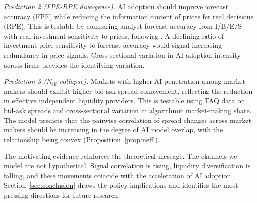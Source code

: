 \emph{Prediction 2 (FPE-RPE divergence).} AI adoption should improve forecast accuracy (FPE) while reducing the information content of prices for real decisions (RPE). This is testable by comparing analyst forecast accuracy from I/B/E/S with real investment sensitivity to prices, following \citet{bond2012}. A declining ratio of investment-price sensitivity to forecast accuracy would signal increasing redundancy in price signals. Cross-sectional variation in AI adoption intensity across firms provides the identifying variation.

\emph{Prediction 3 ($N_{\text{eff}}$ collapse).} Markets with higher AI penetration among market makers should exhibit higher bid-ask spread comovement, reflecting the reduction in effective independent liquidity providers. This is testable using TAQ data on bid-ask spreads and cross-sectional variation in algorithmic market-making share. The model predicts that the pairwise correlation of spread changes across market makers should be increasing in the degree of AI model overlap, with the relationship being convex (Proposition~\ref{prop:neff}).

The motivating evidence reinforces the theoretical message. The channels we model are not hypothetical. Signal correlation is rising, liquidity diversification is falling, and these movements coincide with the acceleration of AI adoption. Section~\ref{sec:conclusion} draws the policy implications and identifies the most pressing directions for future research.
